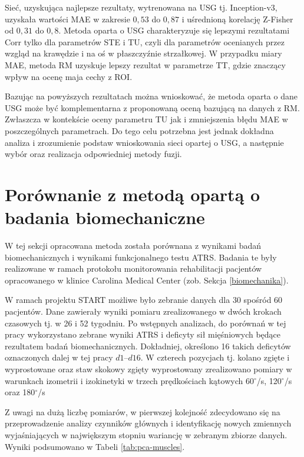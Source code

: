 Sieć, uzyskująca najlepsze rezultaty, wytrenowana na USG tj. Inception-v3, uzyskała wartości MAE w zakresie $0,53$ do $0,87$ i uśrednioną korelację Z-Fisher od $0,31$ do $0,8$.
Metoda oparta o USG charakteryzuje się lepszymi rezultatami Corr tylko dla parametrów STE i TU, czyli dla parametrów ocenianych przez wzgląd na krawędzie i na oś w płaszczyźnie strzałkowej. W przypadku miary MAE, metoda RM uzyskuje lepszy rezultat w parametrze TT, gdzie znaczący wpływ na ocenę maja cechy z ROI.

Bazując na powyższych rezultatach można wnioskować, że metoda oparta o dane USG może być komplementarna z proponowaną oceną bazującą na danych z RM. Zwłaszcza w kontekście oceny parametru TU jak i zmniejszenia błędu MAE w poszczególnych parametrach. Do tego celu potrzebna jest jednak dokładna analiza i zrozumienie podstaw wnioskowania sieci opartej o USG, a następnie wybór oraz realizacja odpowiedniej metody fuzji.

\section{Porównanie z metodą opartą o badania biomechaniczne}
\label{seq:comp-biomechanics}
W tej sekcji opracowana metoda została porównana z wynikami badań biomechanicznych i wynikami funkcjonalnego testu ATRS. Badania te były realizowane w ramach protokołu monitorowania rehabilitacji pacjentów opracowanego w klinice Carolina Medical Center (zob. Sekcja \ref{biomechanika}). 

W ramach projektu START możliwe było zebranie danych dla 30 spośród 60 pacjentów. Dane zawierały wyniki pomiaru zrealizowanego w dwóch krokach czasowych tj. w 26 i 52 tygodniu. Po wstępnych analizach, do porównań w tej pracy wykorzystano zebrane wyniki ATRS i deficyty sił mięśniowych będące rezultatem badań biomechanicznych. Dokładniej, określono 16 takich deficytów oznaczonych dalej w tej pracy $d1$--$d16$. W czterech pozycjach tj. kolano zgięte i wyprostowane oraz staw skokowy zgięty wyprostowany zrealizowano pomiary w warunkach izometrii i izokinetyki w trzech prędkościach kątowych 60$^\circ$/s, 120$^\circ$/s oraz 180$^\circ$/s  

Z uwagi na dużą liczbę pomiarów, w pierwszej kolejność zdecydowano się na przeprowadzenie analizy czynników głównych i identyfikację nowych zmiennych wyjaśniających w największym stopniu wariancję w zebranym zbiorze danych. Wyniki podsumowano w Tabeli \ref{tab:pca-muscles}.

